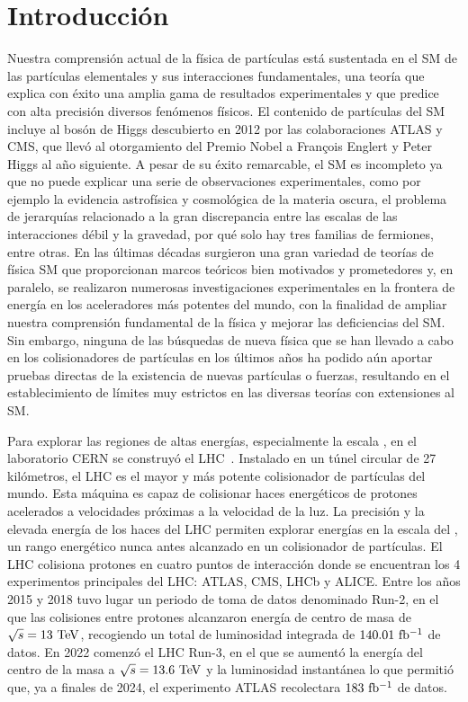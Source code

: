 \chapter*{Introducción}


Nuestra comprensión actual de la física de partículas está sustentada en el \ac{SM} de las partículas elementales y sus interacciones fundamentales, una teoría que explica con éxito una amplia gama de resultados experimentales y que predice con alta precisión diversos fenómenos físicos. El contenido de partículas del \ac{SM} incluye al bosón de Higgs descubierto en 2012 por las colaboraciones \acs{ATLAS} y \acs{CMS}, que llevó al otorgamiento del Premio Nobel a François Englert y Peter Higgs al año siguiente. A pesar de su éxito remarcable, el \ac{SM} es incompleto ya que no puede explicar una serie de observaciones experimentales, como por ejemplo  la evidencia astrofísica y cosmológica de la materia oscura, el problema de jerarquías relacionado a la gran discrepancia entre las escalas de las interacciones débil y la gravedad, por qué solo hay tres familias de fermiones, entre otras. En las últimas décadas surgieron una gran variedad de teorías de física \ac{SM} que proporcionan marcos teóricos bien motivados y prometedores y, en paralelo, se realizaron numerosas investigaciones experimentales en la frontera de energía en los aceleradores más potentes del mundo, con la finalidad de ampliar nuestra comprensión fundamental de la física y mejorar las deficiencias del \ac{SM}. Sin embargo, ninguna de las búsquedas de nueva física que se han llevado a cabo en los colisionadores de partículas en los últimos años ha podido aún aportar pruebas directas de la existencia de nuevas partículas o fuerzas, resultando en el establecimiento de límites muy estrictos en las diversas teorías con extensiones al \ac{SM}.

Para explorar las regiones de altas energías, especialmente la escala \TeV, en el laboratorio \ac{CERN} se construyó el \ac{LHC}~\cite{LHC-Machine}. Instalado en un túnel circular de 27 kilómetros, el \ac{LHC} es el mayor y más potente colisionador de partículas del mundo. Esta máquina es capaz de colisionar haces energéticos de protones acelerados a velocidades próximas a la velocidad de la luz. La precisión y la elevada energía de los haces del \ac{LHC} permiten explorar energías en la escala del \TeV, un rango energético nunca antes alcanzado en un colisionador de partículas. El \ac{LHC} colisiona protones en cuatro puntos de interacción donde se encuentran los 4 experimentos principales del \ac{LHC}: \ac{ATLAS}, \ac{CMS}, \ac{LHCb} y \ac{ALICE}. Entre los años 2015 y 2018 tuvo lugar un periodo de toma de datos denominado Run-2, en el que las colisiones entre protones alcanzaron energía de centro de masa de \(\sqs = 13~\TeV\), recogiendo un total de luminosidad integrada de \(140.01~\ifb\) de datos. En 2022 comenzó el \ac{LHC} Run-3, en el que se aumentó la energía del centro de la masa a \(\sqs = 13.6~\TeV\) y la luminosidad instantánea lo que permitió que, ya a finales de 2024, el experimento \ac{ATLAS} recolectara \(183~\ifb\) de datos.

